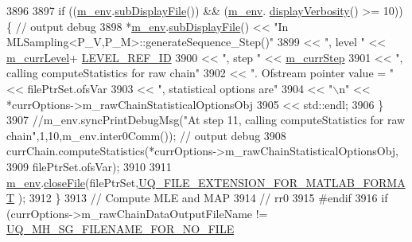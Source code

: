 \begin{DoxyCode}
3896 
3897     \textcolor{keywordflow}{if} ((\hyperlink{class_q_u_e_s_o_1_1_m_l_sampling_a13f1ca4fe9f94822fe572a743eaced1d}{m\_env}.\hyperlink{class_q_u_e_s_o_1_1_base_environment_a8a0064746ae8dddfece4229b9ad374d6}{subDisplayFile}()) && (\hyperlink{class_q_u_e_s_o_1_1_m_l_sampling_a13f1ca4fe9f94822fe572a743eaced1d}{m\_env}.
      \hyperlink{class_q_u_e_s_o_1_1_base_environment_a1fe5f244fc0316a0ab3e37463f108b96}{displayVerbosity}() >= 10)) \{ \textcolor{comment}{// output debug}
3898       *\hyperlink{class_q_u_e_s_o_1_1_m_l_sampling_a13f1ca4fe9f94822fe572a743eaced1d}{m\_env}.\hyperlink{class_q_u_e_s_o_1_1_base_environment_a8a0064746ae8dddfece4229b9ad374d6}{subDisplayFile}() << \textcolor{stringliteral}{"In MLSampling<P\_V,P\_M>::generateSequence\_Step()"}
3899                               << \textcolor{stringliteral}{", level "} << \hyperlink{class_q_u_e_s_o_1_1_m_l_sampling_af9416874c856e50f3b35270e801f17e4}{m\_currLevel}+
      \hyperlink{_m_l_sampling_level_options_8h_a68d15eaf394d210effcf584b938206d3}{LEVEL\_REF\_ID}
3900                               << \textcolor{stringliteral}{", step "}  << \hyperlink{class_q_u_e_s_o_1_1_m_l_sampling_a1b1f8ccb4823bdfa26ec652f0807c63e}{m\_currStep}
3901                               << \textcolor{stringliteral}{", calling computeStatistics for raw chain"}
3902                               << \textcolor{stringliteral}{". Ofstream pointer value = "} << filePtrSet.ofsVar
3903                               << \textcolor{stringliteral}{", statistical options are"}
3904                               << \textcolor{stringliteral}{"\(\backslash\)n"} << *currOptions->m\_rawChainStatisticalOptionsObj
3905                               << std::endl;
3906     \}
3907     \textcolor{comment}{//m\_env.syncPrintDebugMsg("At step 11, calling computeStatistics for raw
       chain",1,10,m\_env.inter0Comm()); // output debug}
3908     currChain.computeStatistics(*currOptions->m\_rawChainStatisticalOptionsObj,
3909                                 filePtrSet.ofsVar);
3910 
3911     \hyperlink{class_q_u_e_s_o_1_1_m_l_sampling_a13f1ca4fe9f94822fe572a743eaced1d}{m\_env}.\hyperlink{class_q_u_e_s_o_1_1_base_environment_ab712bff194ddd91459d4ea8715c77e8b}{closeFile}(filePtrSet,\hyperlink{_defines_8h_ac440026eff7deb1c1eed1eea0e8e36ba}{UQ\_FILE\_EXTENSION\_FOR\_MATLAB\_FORMAT}
      );
3912   \}
3913   \textcolor{comment}{// Compute MLE and MAP}
3914   \textcolor{comment}{// rr0}
3915 \textcolor{preprocessor}{#endif}
3916 \textcolor{preprocessor}{}  \textcolor{keywordflow}{if} (currOptions->m\_rawChainDataOutputFileName != \hyperlink{_metropolis_hastings_s_g_options_8h_a75699ceb938d800e2b7f59ede3ea9a31}{UQ\_MH\_SG\_FILENAME\_FOR\_NO\_FILE}

\end{DoxyCode}
